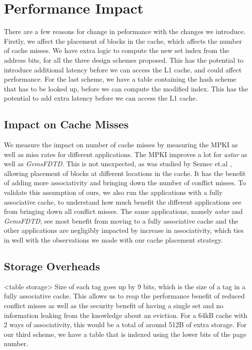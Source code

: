 \section{Performance Impact}
There are a few reasons for change in peformance with the changes we introduce. Firstly, we affect the placement of blocks in the cache, which affects the number of cache misses. We have extra logic to compute the new set index from the address bits, for all the three design schemes proposed. This has the potential to introduce additional latency before we can access the L1 cache, and could affect performance. For the last scheme, we have a table containing the hash scheme that has to be looked up, before we can compute the modified index. This has the potential to add extra latency before we can access the L1 cache.   
\subsection {Impact on Cache Misses}
We measure the impact on number of cache misses by measuring the MPKI as well as miss rates for different applications. The MPKI improves a lot for \textit{astar} as well as \textit{GemsFDTD}. This is not unexpected, as was studied by Seznec et.al \cite{skewed}, allowing placement of blocks at different locations in the cache. It has the benefit of adding more associativity and bringing down the number of conflict misses. To validate this assumption of ours, we also run the applications with a fully associative cache, to understand how much benefit the different applications see from bringing down all conflict misses. The same applications, namely \textit{astar} and \textit{GemsFDTD}, see most benefit from moving to a fully associative cache and the other applications are negligibly impacted by increase in associativity, which ties in well with the observations we made with our cache placement strategy.   
\subsection {Storage Overheads} <table storage>
Size of each tag goes up by 9 bits, which is the size of a tag in a fully associative cache. This allows us to reap the performance benefit of reduced conflict misses as well as the security benefit of having a single set and no information leaking from the knowledge about an eviction. For a 64kB cache with 2 ways of associativity, this would be a total of around 512B of extra storage.    
For our third scheme, we have a table that is indexed using the lower bits of the page number. 
